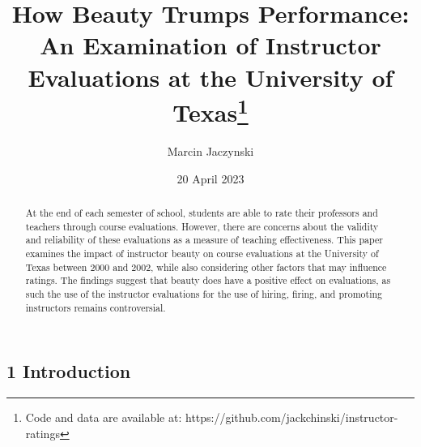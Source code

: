 \documentclass[
  letterpaper,
  DIV=11,
  numbers=noendperiod]{scrartcl}
\title{How Beauty Trumps Performance: An Examination of Instructor
Evaluations at the University of Texas\thanks{Code and data are
available at: https://github.com/jackchinski/instructor-ratings}}
\author{Marcin Jaczynski}
\date{20 April 2023}
\begin{document}
\maketitle
\begin{abstract}
At the end of each semester of school, students are able to rate their
professors and teachers through course evaluations. However, there are
concerns about the validity and reliability of these evaluations as a
measure of teaching effectiveness. This paper examines the impact of
instructor beauty on course evaluations at the University of Texas
between 2000 and 2002, while also considering other factors that may
influence ratings. The findings suggest that beauty does have a positive
effect on evaluations, as such the use of the instructor evaluations for
the use of hiring, firing, and promoting instructors remains
controversial.
\end{abstract}
\ifdefined\Shaded\renewenvironment{Shaded}{\begin{tcolorbox}[frame hidden, borderline west={3pt}{0pt}{shadecolor}, interior hidden, boxrule=0pt, breakable, enhanced, sharp corners]}{\end{tcolorbox}}\fi

\hypertarget{introduction}{%
\subsection{1 Introduction}\label{introduction}}
\end{document}
